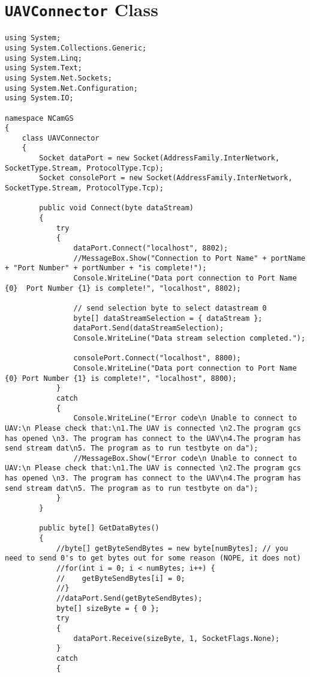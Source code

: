 \lstset{numbers=left,
numberstyle=\footnotesize, 
stepnumber=2,numbersep=5pt}
\section{\texttt{UAVConnector} Class}
\begin{lstlisting}[caption=\texttt{UAVConnector} Class, label=appen:UAVConnector]
using System;
using System.Collections.Generic;
using System.Linq;
using System.Text;
using System.Net.Sockets;
using System.Net.Configuration;
using System.IO;

namespace NCamGS
{
    class UAVConnector
    {
        Socket dataPort = new Socket(AddressFamily.InterNetwork, SocketType.Stream, ProtocolType.Tcp);
        Socket consolePort = new Socket(AddressFamily.InterNetwork, SocketType.Stream, ProtocolType.Tcp);

        public void Connect(byte dataStream)
        {
            try
            {
                dataPort.Connect("localhost", 8802);
                //MessageBox.Show("Connection to Port Name" + portName + "Port Number" + portNumber + "is complete!");
                Console.WriteLine("Data port connection to Port Name {0}  Port Number {1} is complete!", "localhost", 8802);

                // send selection byte to select datastream 0
                byte[] dataStreamSelection = { dataStream };
                dataPort.Send(dataStreamSelection);
                Console.WriteLine("Data stream selection completed.");

                consolePort.Connect("localhost", 8800);
                Console.WriteLine("Data port connection to Port Name {0} Port Number {1} is complete!", "localhost", 8800);
            }
            catch
            {
                Console.WriteLine("Error code\n Unable to connect to UAV:\n Please check that:\n1.The UAV is connected \n2.The program gcs has opened \n3. The program has connect to the UAV\n4.The program has send stream dat\n5. The program as to run testbyte on da");
                //MessageBox.Show("Error code\n Unable to connect to UAV:\n Please check that:\n1.The UAV is connected \n2.The program gcs has opened \n3. The program has connect to the UAV\n4.The program has send stream dat\n5. The program as to run testbyte on da");
            }
        }

        public byte[] GetDataBytes()
        {
            //byte[] getByteSendBytes = new byte[numBytes]; // you need to send 0's to get bytes out for some reason (NOPE, it does not)
            //for(int i = 0; i < numBytes; i++) {
            //    getByteSendBytes[i] = 0;
            //}
            //dataPort.Send(getByteSendBytes);
            byte[] sizeByte = { 0 };
            try
            {
                dataPort.Receive(sizeByte, 1, SocketFlags.None);
            }
            catch
            {
                

\end{lstlisting}
